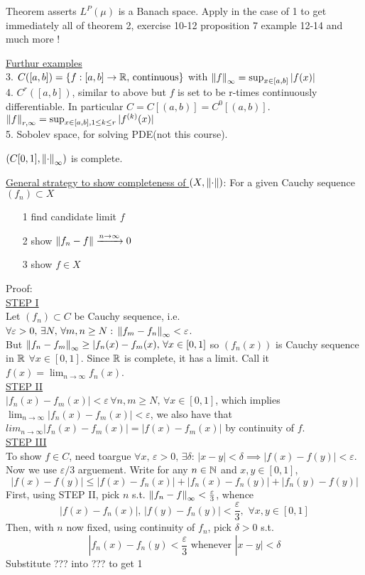 \documentclass{article}
\begin{document}
\begin{remark}
    Theorem asserts $L^P(\mu)$ is a Banach space. Apply in the case of 1 to get immediately all of theorem 2, exercise 10-12 proposition 7 example 12-14 and much more
    !
    
\end{remark}

\underline{Furthur examples}\\
3. $C([a,b])=\{f:[a,b]\to\mathbb{R},\,\text{continuous}\}$ with $\left\|{f}\right\|_\infty=\sup_{x\in[a,b]}|f(x)|$\\
4. $C^r([a,b])$, similar to above but $f$ is set to be r-times continuously differentiable. In particular $C=C[(a,b)]=C^0[(a,b)]$.  $\left\|{f}\right\|_{r,\infty}=\sup_{x\in[a,b],1\leq k\leq r}|f^{(k)}(x)|$\\
5. Sobolev space, for solving PDE(not this course).

\begin{proposition}
$(C[0,1],\left\|{\cdot}\right\|_\infty)$ is complete.
\end{proposition}
\underline{General strategy to show completeness of  $(X,\left\|{\cdot}\right\|)$}: For a given Cauchy sequence $(f_n)\subset X$
\begin{itemize}
    \item [1] find candidate limit $f$
    \item [2] show $\left\|{f_n-f}\right\|\xrightarrow{n\to\infty}0$
    \item [3] show $f\in X$
\end{itemize}

Proof:\\
\underline{STEP I}\\
Let $(f_n)\subset C$ be Cauchy sequence, i.e. $\forall \varepsilon>0,\,\exists N,\,\forall m,n\geq N:\,\left\|{f_m-f_n}\right\|_\infty<\varepsilon$.\\
But $\left\|{f_n-f_m}\right\|_\infty\geq|f_n(x)-f_m(x),\,\forall x\in[0,1]$ so $\left(f_n(x)\right)$ is Cauchy sequence in $\mathbb{R}$ $\forall  x\in[0,1]$. Since $\mathbb{R}$ is complete, it has a limit. Call it $f(x)=\lim_{n\to\infty}f_n(x)$.\\
\underline{STEP II}\\
$|f_n(x)-f_m(x)|<\varepsilon\,\forall n,m\geq N,\,\forall x\in[0,1]$, which implies 
$\lim_{n\to\infty}|f_n(x)-f_m(x)|<\varepsilon$, we also have that $lim_{n\to\infty}|f_n(x)-f_m(x)|=|f(x)-f_m(x)|$ by continuity of $f$.\\
\underline{STEP III}\\
To show $f\in C$, need toargue $\forall x,\,\varepsilon>0,\,\exists\delta:\,|x-y|<\delta\implies |f(x)-f(y)|<\varepsilon$. Now we use $\varepsilon/3$ arguement. Write for any $n\in\mathbb{N}$ and $x,y\in[0,1]$,
$$
|f(x)-f(y)|\leq|f(x)-f_n(x)|+|f_n(x)-f_n(y)|+|f_n(y)-f(y)|
$$
First, using STEP II, pick $n$ s.t. $\left\|{f_n-f}\right\|_\infty<\frac{\varepsilon}{3}$, whence
$$
|f(x)-f_n(x)|,\,|f(y)-f_n(y)|<\frac{\varepsilon}{3},\,\,\forall x,y\in[0,1]
$$
Then, with $n$ now fixed, using continuity of $f_n$, pick $\delta>0$ s.t. 
$$
|f_n(x)-f_n(y)<\frac{\varepsilon}{3}\text{ whenever } |x-y|<\delta$$
Substitute {\color{red}???} into ??? to get 1
\end{document}
